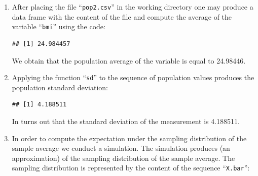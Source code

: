 \documentclass[]{krantz}
\makeatletter
\newenvironment{Shaded}{\begin{snugshade}}{\end{snugshade}}
\newcommand{\KeywordTok}[1]{\textcolor[rgb]{0.13,0.29,0.53}{\textbf{#1}}}
\newcommand{\DataTypeTok}[1]{\textcolor[rgb]{0.13,0.29,0.53}{#1}}
\newcommand{\DecValTok}[1]{\textcolor[rgb]{0.00,0.00,0.81}{#1}}
\newcommand{\StringTok}[1]{\textcolor[rgb]{0.31,0.60,0.02}{#1}}
\newcommand{\ControlFlowTok}[1]{\textcolor[rgb]{0.13,0.29,0.53}{\textbf{#1}}}
\newcommand{\OperatorTok}[1]{\textcolor[rgb]{0.81,0.36,0.00}{\textbf{#1}}}
\newcommand{\NormalTok}[1]{#1}
\newenvironment{kframe}{%
\medskip{}
\setlength{\fboxsep}{.8em}
 \def\at@end@of@kframe{}%
 \ifinner\ifhmode%
  \def\at@end@of@kframe{\end{minipage}}%
  \begin{minipage}{\columnwidth}%
 \fi\fi%
 \def\FrameCommand##1{\hskip\@totalleftmargin \hskip-\fboxsep
 \colorbox{shadecolor}{##1}\hskip-\fboxsep
     \hskip-\linewidth \hskip-\@totalleftmargin \hskip\columnwidth}%
 \MakeFramed {\advance\hsize-\width
   \@totalleftmargin\z@ \linewidth\hsize
   \@setminipage}}%
 {\par\unskip\endMakeFramed%
 \at@end@of@kframe}
\renewenvironment{Shaded}{\begin{kframe}}{\end{kframe}}
\theoremstyle{definition}
\theoremstyle{definition}
\theoremstyle{definition}
\theoremstyle{remark}
\makeatother
\begin{document}
\begin{enumerate}
\def\labelenumi{\arabic{enumi}.}
\item
  After placing the file ``\texttt{pop2.csv}'' in the working directory
  one may produce a data frame with the content of the file and compute
  the average of the variable ``\texttt{bmi}'' using the code:

\begin{Shaded}
\end{Shaded}

\begin{verbatim}
## [1] 24.984457
\end{verbatim}

  We obtain that the population average of the variable is equal to
  24.98446.
\item
  Applying the function ``\texttt{sd}'' to the sequence of population
  values produces the population standard deviation:

\begin{Shaded}
\end{Shaded}

\begin{verbatim}
## [1] 4.188511
\end{verbatim}

  In turns out that the standard deviation of the measurement is
  4.188511.
\item
  In order to compute the expectation under the sampling distribution of
  the sample average we conduct a simulation. The simulation produces
  (an approximation) of the sampling distribution of the sample average.
  The sampling distribution is represented by the content of the
  sequence ``\texttt{X.bar}'':

\begin{Shaded}
\end{Shaded}


\end{enumerate}
\end{document}
